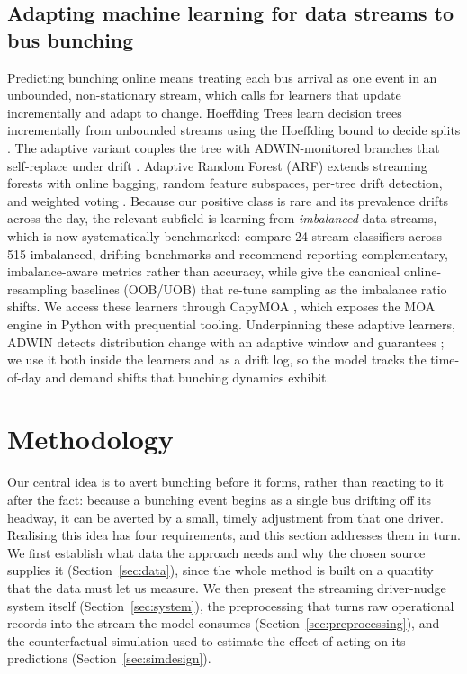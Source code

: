 \documentclass[final,5p,times,twocolumn,authoryear]{elsarticle}
\begin{document}
\subsection{Adapting machine learning for data streams to bus bunching}
\label{sec:rw-ml}
Predicting bunching online means treating each bus arrival as one event in an unbounded,
non-stationary stream, which calls for learners that update incrementally and adapt to change.
Hoeffding Trees learn decision trees incrementally from unbounded streams using the Hoeffding
bound to decide splits \citep{Domingos2000}. The adaptive variant couples the tree with
ADWIN-monitored branches that self-replace under drift \citep{Bifet2009}. Adaptive Random
Forest (ARF) extends streaming forests with online bagging, random feature subspaces, per-tree
drift detection, and weighted voting \citep{Gomes2017}. Because our positive class is rare and its
prevalence drifts across the day, the relevant subfield is learning from \emph{imbalanced} data
streams, which is now systematically benchmarked: \citet{Aguiar2024} compare 24 stream classifiers
across 515 imbalanced, drifting benchmarks and recommend reporting complementary, imbalance-aware
metrics rather than accuracy, while \citet{WangMinkuYao2015} give the canonical online-resampling
baselines (OOB/UOB) that re-tune sampling as the imbalance ratio shifts. We access these learners
through CapyMOA \citep{CapyMOA2024}, which exposes the MOA engine in Python with prequential
tooling. Underpinning these adaptive learners, ADWIN detects distribution change with an adaptive
window and guarantees \citep{Bifet2007}; we use it both inside the learners and as a drift log,
so the model tracks the time-of-day and demand shifts that bunching dynamics exhibit.

\section{Methodology}
\label{sec:method}

Our central idea is to avert bunching before it forms, rather than reacting to it after the fact:
because a bunching event begins as a single bus drifting off its headway, it can be averted by a
small, timely adjustment from that one driver. Realising this idea has four requirements, and this
section addresses them in turn. We first establish what data the approach needs and why the chosen
source supplies it (Section~\ref{sec:data}), since the whole method is built on a quantity that the
data must let us measure. We then present the streaming driver-nudge system itself
(Section~\ref{sec:system}), the preprocessing that turns raw operational records into the stream the
model consumes (Section~\ref{sec:preprocessing}), and the counterfactual simulation used to estimate
the effect of acting on its predictions (Section~\ref{sec:simdesign}).
\end{document}
